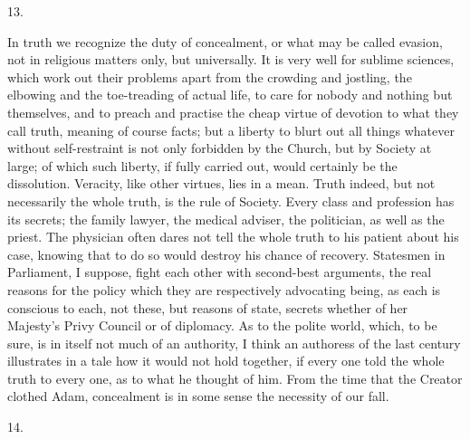 13.

In truth we recognize the duty of concealment, or what may be
called evasion, not in religious matters only, but universally. It is
very well for sublime sciences, which work out their problems apart
from the crowding and jostling, the elbowing and the toe-treading of
actual life, to care for nobody and nothing but themselves, and to
preach and practise the cheap virtue of devotion to what they call
truth, meaning of course facts; but a liberty to blurt out all things
whatever without self-restraint is not only forbidden by the Church,
but by Society at large; of which such liberty, if fully carried out,
would certainly be the dissolution. Veracity, like other
virtues, lies in a mean. Truth indeed, but not necessarily the whole
truth, is the rule of Society. Every class and profession has its
secrets; the family lawyer, the medical adviser, the politician, as
well as the priest. The physician often dares not tell the whole truth
to his patient about his case, knowing that to do so would destroy his
chance of recovery. Statesmen in Parliament, I suppose, fight each
other with second-best arguments, the real reasons for the policy
which they are respectively advocating being, as each is conscious to
each, not these, but reasons of state, secrets whether of her Majesty's
Privy Council or of diplomacy. As to the polite world, which, to be
sure, is in itself not much of an authority, I think an authoress of
the last century illustrates in a tale how it would not hold together,
if every one told the whole truth to every one, as to what he thought
of him. From the time that the Creator clothed Adam, concealment is in
some sense the necessity of our fall.

14.

